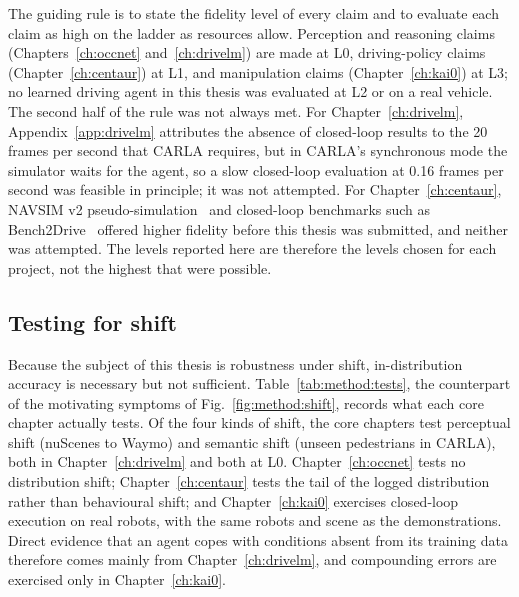 The guiding rule is to state the fidelity level of every claim and to evaluate each claim as high on the ladder as resources allow. Perception and reasoning claims (Chapters~\ref{ch:occnet} and~\ref{ch:drivelm}) are made at L0, driving-policy claims (Chapter~\ref{ch:centaur}) at L1, and manipulation claims (Chapter~\ref{ch:kai0}) at L3; no learned driving agent in this thesis was evaluated at L2 or on a real vehicle. The second half of the rule was not always met. For Chapter~\ref{ch:drivelm}, Appendix~\ref{app:drivelm} attributes the absence of closed-loop results to the 20 frames per second that CARLA requires, but in CARLA's synchronous mode the simulator waits for the agent, so a slow closed-loop evaluation at 0.16 frames per second was feasible in principle; it was not attempted. For Chapter~\ref{ch:centaur}, NAVSIM v2 pseudo-simulation~\cite{cao2025pseudo} and closed-loop benchmarks such as Bench2Drive~\cite{jia2024bench2drive} offered higher fidelity before this thesis was submitted, and neither was attempted. The levels reported here are therefore the levels chosen for each project, not the highest that were possible.

\subsection{Testing for shift}\label{sec:method:testing}

Because the subject of this thesis is robustness under shift, in-distribution accuracy is necessary but not sufficient. Table~\ref{tab:method:tests}, the counterpart of the motivating symptoms of Fig.~\ref{fig:method:shift}, records what each core chapter actually tests. Of the four kinds of shift, the core chapters test perceptual shift (nuScenes to Waymo) and semantic shift (unseen pedestrians in CARLA), both in Chapter~\ref{ch:drivelm} and both at L0. Chapter~\ref{ch:occnet} tests no distribution shift; Chapter~\ref{ch:centaur} tests the tail of the logged distribution rather than behavioural shift; and Chapter~\ref{ch:kai0} exercises closed-loop execution on real robots, with the same robots and scene as the demonstrations. Direct evidence that an agent copes with conditions absent from its training data therefore comes mainly from Chapter~\ref{ch:drivelm}, and compounding errors are exercised only in Chapter~\ref{ch:kai0}.

